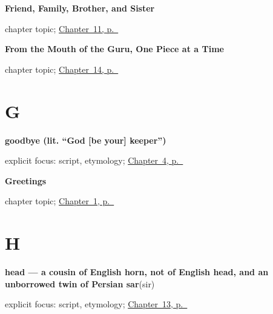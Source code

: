 \noindent\begin{minipage}[t]{\linewidth}
\raggedright
\textbf{Friend, Family, Brother, and Sister}\par
\footnotesize chapter topic; \hyperref[ch:pa-friend-and-family]{Chapter~11, p.~\pageref*{ch:pa-friend-and-family}}
\end{minipage}\par\smallskip

\noindent\begin{minipage}[t]{\linewidth}
\raggedright
\textbf{From the Mouth of the Guru, One Piece at a Time}\par
\footnotesize chapter topic; \hyperref[ch:pa-script-first]{Chapter~14, p.~\pageref*{ch:pa-script-first}}
\end{minipage}\par\smallskip

\section*{G}

\noindent\begin{minipage}[t]{\linewidth}
\raggedright
\textbf{goodbye (lit. \textquotedblleft{}God {[}be your{]} keeper\textquotedblright{})}\enspace\emph{ }\par
\footnotesize explicit focus: script, etymology; \hyperref[ch:farewells]{Chapter~4, p.~\pageref*{ch:farewells}}
\end{minipage}\par\smallskip

\noindent\begin{minipage}[t]{\linewidth}
\raggedright
\textbf{Greetings}\par
\footnotesize chapter topic; \hyperref[ch:greetings]{Chapter~1, p.~\pageref*{ch:greetings}}
\end{minipage}\par\smallskip

\section*{H}

\noindent\begin{minipage}[t]{\linewidth}
\raggedright
\textbf{head — a cousin of English horn, not of English head, and an unborrowed twin of Persian sar}\enspace\emph{}\enspace(sir)\par
\footnotesize explicit focus: script, etymology; \hyperref[ch:pa-heart-and-head]{Chapter~13, p.~\pageref*{ch:pa-heart-and-head}}
\end{minipage}\par\smallskip

